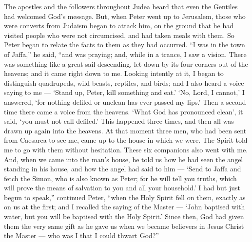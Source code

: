  The apostles and the followers throughout Judea heard that
even the Gentiles had welcomed God's message.  But, when
Peter went up to Jerusalem, those who were converts from Judaism began
to attack him,  on the ground that he had visited people who
were not circumcised, and had taken meals with them.  So
Peter began to relate the facts to them as they had occurred.
 ``I was in the town of Jaffa,'' he said, ``and was praying;
and, while in a trance, I saw a vision. There was something like a great
sail descending, let down by its four corners out of the heavens; and it
came right down to me.  Looking intently at it, I began to
distinguish quadrupeds, wild beasts, reptiles, and birds; 
and I also heard a voice saying to me --- `Stand up, Peter, kill
something and eat.'  `No, Lord, I cannot,' I answered, `for
nothing defiled or unclean has ever passed my lips.'  Then a
second time there came a voice from the heavens. `What God has
pronounced clean', it said, `you must not call defiled.' 
This happened three times, and then all was drawn up again into the
heavens.  At that moment three men, who had been sent from
Caesarea to see me, came up to the house in which we were. 
The Spirit told me to go with them without hesitation. These six
companions also went with me. And, when we came into the man's house,
 he told us how he had seen the angel standing in his
house, and how the angel had said to him --- `Send to Jaffa and fetch
the Simon, who is also known as Peter;  for he will tell
you truths, which will prove the means of salvation to you and all your
household.'  I had but just begun to speak,'' continued
Peter, ``when the Holy Spirit fell on them, exactly as on us at the
first;  and I recalled the saying of the Master --- `John
baptised with water, but you will be baptised with the Holy Spirit.'
 Since then, God had given them the very same gift as he
gave us when we became believers in Jesus Christ the Master --- who was
I that I could thwart God?''

